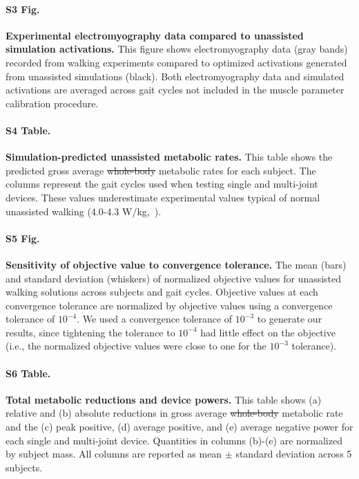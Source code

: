 \documentclass[10pt,letterpaper]{article}
\providecommand{\DIFaddtex}[1]{{\protect\color{blue}{#1}}} %
\providecommand{\DIFdeltex}[1]{{\protect\color{red}\sout{#1}}}                      %
\providecommand{\DIFaddbegin}{} %
\providecommand{\DIFaddend}{} %
\providecommand{\DIFdelbegin}{} %
\providecommand{\DIFdelend}{} %
\providecommand{\DIFadd}[1]{\texorpdfstring{\DIFaddtex{#1}}{#1}} %
\providecommand{\DIFdel}[1]{\texorpdfstring{\DIFdeltex{#1}}{}} %
\newcommand{\DIFscaledelfig}{0.5}
\newlength{\DIFdelgraphicswidth} %
\newlength{\DIFdelgraphicsheight} %
\newcommand{\DIFaddincludegraphics}[2][]{{\color{blue}\fbox{\DIFOincludegraphics[#1]{#2}}}} %
\newcommand{\DIFdelincludegraphics}[2][]{%
\sbox{\DIFdelgraphicsbox}{\DIFOincludegraphics[#1]{#2}}%
\settoboxwidth{\DIFdelgraphicswidth}{\DIFdelgraphicsbox} %
\settoboxtotalheight{\DIFdelgraphicsheight}{\DIFdelgraphicsbox} %
\scalebox{\DIFscaledelfig}{%
\parbox[b]{\DIFdelgraphicswidth}{\usebox{\DIFdelgraphicsbox}\\[-\baselineskip] \rule{\DIFdelgraphicswidth}{0em}}\llap{\resizebox{\DIFdelgraphicswidth}{\DIFdelgraphicsheight}{%
\setlength{\unitlength}{\DIFdelgraphicswidth}%
\begin{picture}(1,1)%
\thicklines\linethickness{2pt} %
{\color[rgb]{1,0,0}\put(0,0){\framebox(1,1){}}}%
{\color[rgb]{1,0,0}\put(0,0){\line( 1,1){1}}}%
{\color[rgb]{1,0,0}\put(0,1){\line(1,-1){1}}}%
\end{picture}%
}*{3pt}}} %
} %
\DeclareRobustCommand{\DIFaddbegin}{\DIFOaddbegin \let\includegraphics\DIFaddincludegraphics} %
\DeclareRobustCommand{\DIFaddend}{\DIFOaddend \let\includegraphics\DIFOincludegraphics} %
\DeclareRobustCommand{\DIFdelbegin}{\DIFOdelbegin \let\includegraphics\DIFdelincludegraphics} %
\DeclareRobustCommand{\DIFdelend}{\DIFOaddend \let\includegraphics\DIFOincludegraphics} %
\begin{document}
\paragraph*{S3 Fig.}
\label{S3_Fig}
{\bf Experimental electromyography data compared to unassisted simulation activations.} This figure shows electromyography data (gray bands) recorded from walking experiments compared to optimized activations generated from unassisted simulations (black). Both electromyography data and simulated activations are averaged across gait cycles not included in the muscle parameter calibration procedure.

\paragraph*{S4 Table.}
\label{S4_Table}
{\bf Simulation-predicted unassisted metabolic rates.} This table shows the predicted gross average \DIFdelbegin \DIFdel{whole-body }\DIFdelend \DIFaddbegin \DIFadd{total }\DIFaddend metabolic rates for each subject. The columns represent the gait cycles used when testing single and multi-joint devices. These values underestimate experimental values typical of normal unassisted walking (4.0-4.3 W/kg,~\cite{Waters:1999}).

\paragraph*{S5 Fig.}
\label{S5_Fig}
{\bf Sensitivity of objective value to convergence tolerance.} The mean (bars) and standard deviation (whiskers) of normalized objective values for unassisted walking solutions across subjects and gait cycles. Objective values at each convergence tolerance are normalized by objective values using a convergence tolerance of $10^{-4}$. We used a convergence tolerance of $10^{-3}$ to generate our results, since tightening the tolerance to $10^{-4}$ had little effect on the objective (i.e., the normalized objective values were close to one for the $10^{-3}$ tolerance).

\paragraph*{S6 Table.}
\label{S6_Table}
{\bf Total metabolic reductions and device powers.} This table shows (a) relative and (b) absolute reductions in gross average \DIFdelbegin \DIFdel{whole-body }\DIFdelend \DIFaddbegin \DIFadd{total }\DIFaddend metabolic rate and the (c) peak positive, (d) average positive, and (e) average negative power for each single and multi-joint device. Quantities in columns (b)-(e) are normalized by subject mass. All columns are reported as mean $\pm$ standard deviation across 5 subjects.
\end{document}
